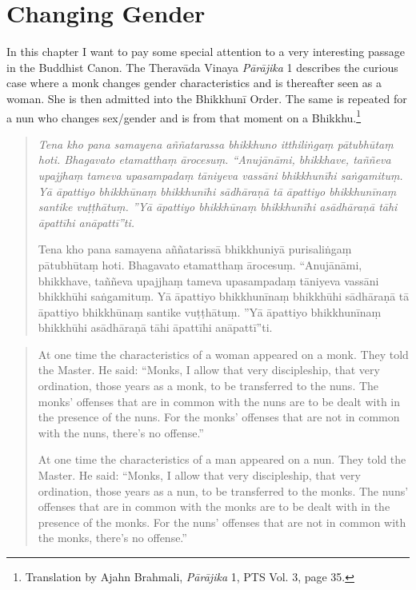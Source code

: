 \section{Changing Gender}
\label{trans}

In this chapter I want to pay some special attention to a very interesting passage in the Buddhist Canon. The Theravāda Vinaya {\em Pā­rāji­ka} 1 describes the curious case where a monk changes gender characteristics and is thereafter seen as a woman. She is then admitted into the Bhikkhunī Order. The same is repeated for a nun who changes sex/gender and is from that moment on a Bhikkhu.\footnote{Translation by Ajahn Brahmali, {\em Pā­rāji­ka} 1, PTS Vol. 3, page 35.} 

\begin{quote}
{\em Tena kho pana samayena aññatarassa bhikkhuno itthiliṅgaṃ pātubhūtaṃ hoti. Bhagavato etamatthaṃ ārocesuṃ. “Anujānāmi, bhikkhave, taññeva upajjhaṃ tameva upasampadaṃ tāniyeva vassāni bhikkhunīhi saṅgamituṃ. Yā āpattiyo bhikkhūnaṃ bhikkhunīhi sādhāraṇā tā āpattiyo bhikkhunīnaṃ santike vuṭṭhātuṃ. ”Yā āpattiyo bhikkhūnaṃ bhikkhunīhi asādhāraṇā tāhi āpattīhi anāpattī”ti.

Tena kho pana samayena aññatarissā bhikkhuniyā purisaliṅgaṃ pātubhūtaṃ hoti. Bhagavato etamatthaṃ ārocesuṃ. “Anujānāmi, bhikkhave, taññeva upajjhaṃ tameva upasampadaṃ tāniyeva vassāni bhikkhūhi saṅgamituṃ. Yā āpattiyo bhikkhunīnaṃ bhikkhūhi sādhāraṇā tā āpattiyo bhikkhūnaṃ santike vuṭṭhātuṃ. ”Yā āpattiyo bhikkhunīnaṃ bhikkhūhi asādhāraṇā tāhi āpattīhi anāpattī”ti.}
\end{quote}

\begin{quote}
At one time the characteristics of a woman appeared on a monk. They told the Master. He said: “Monks, I allow that very discipleship, that very ordination, those years as a monk, to be transferred to the nuns. The monks’ offenses that are in common with the nuns are to be dealt with in the presence of the nuns. For the monks’ offenses that are not in common with the nuns, there’s no offense.”

At one time the characteristics of a man appeared on a nun. They told the Master. He said: “Monks, I allow that very discipleship, that very ordination, those years as a nun, to be transferred to the monks. The nuns’ offenses that are in common with the monks are to be dealt with in the presence of the monks. For the nuns’ offenses that are not in common with the monks, there’s no offense.”
\end{quote}

